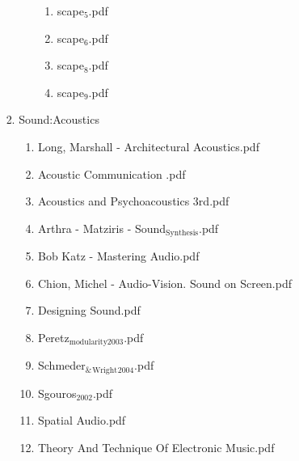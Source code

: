 \documentclass[11pt]{article}
\begin{document}
\begin{enumerate}
\begin{enumerate}
\begin{enumerate}
\begin{enumerate}
\begin{enumerate}
\begin{enumerate}
\item scape$_{\text{5}}$.pdf
\label{sec-1-1-1-1-7-3-44-20-8}

\item scape$_{\text{6}}$.pdf
\label{sec-1-1-1-1-7-3-44-20-9}

\item scape$_{\text{8}}$.pdf
\label{sec-1-1-1-1-7-3-44-20-10}

\item scape$_{\text{9}}$.pdf
\label{sec-1-1-1-1-7-3-44-20-11}
\end{enumerate}
\end{enumerate}

\item Sound:Acoustics
\label{sec-1-1-1-1-7-3-45}
\begin{enumerate}
\item Long, Marshall - Architectural Acoustics.pdf
\label{sec-1-1-1-1-7-3-45-1}

\item Acoustic Communication .pdf
\label{sec-1-1-1-1-7-3-45-2}

\item Acoustics and Psychoacoustics 3rd.pdf
\label{sec-1-1-1-1-7-3-45-3}

\item Arthra - Matziris - Sound$_{\text{Synthesis}}$.pdf
\label{sec-1-1-1-1-7-3-45-4}

\item Bob Katz - Mastering Audio.pdf
\label{sec-1-1-1-1-7-3-45-5}

\item Chion, Michel - Audio-Vision. Sound on Screen.pdf
\label{sec-1-1-1-1-7-3-45-6}

\item Designing Sound.pdf
\label{sec-1-1-1-1-7-3-45-7}

\item Peretz$_{\text{modularity2003}}$.pdf
\label{sec-1-1-1-1-7-3-45-8}

\item Schmeder$_{\text{\&}}$$_{\text{Wright}}$$_{\text{2004}}$.pdf
\label{sec-1-1-1-1-7-3-45-9}

\item Sgouros$_{\text{2002}}$.pdf
\label{sec-1-1-1-1-7-3-45-10}

\item Spatial Audio.pdf
\label{sec-1-1-1-1-7-3-45-11}

\item Theory And Technique Of Electronic Music.pdf
\label{sec-1-1-1-1-7-3-45-12}


\end{enumerate}
\end{enumerate}
\end{enumerate}
\end{enumerate}
\end{enumerate}
\end{document}

